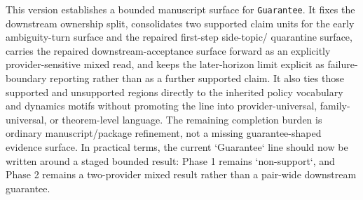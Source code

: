 \documentclass[11pt]{article}
\begin{document}
This version establishes a bounded manuscript surface for \texttt{Guarantee}.
It fixes the downstream ownership split, consolidates two supported claim units
for the early ambiguity-turn surface and the repaired first-step side-topic/
quarantine surface, carries the repaired downstream-acceptance surface forward
as an explicitly provider-sensitive mixed read, and keeps the later-horizon
limit explicit as failure-boundary reporting rather than as a further supported
claim. It also ties those supported and unsupported regions directly to the
inherited policy vocabulary and dynamics motifs without promoting the line into
provider-universal, family-universal, or theorem-level language. The remaining
completion burden is ordinary manuscript/package refinement, not a missing
guarantee-shaped evidence surface. In practical terms, the current `Guarantee`
line should now be written around a staged bounded result: Phase 1 remains
`non-support`, and Phase 2 remains a two-provider mixed result rather than a
pair-wide downstream guarantee.
\end{document}
